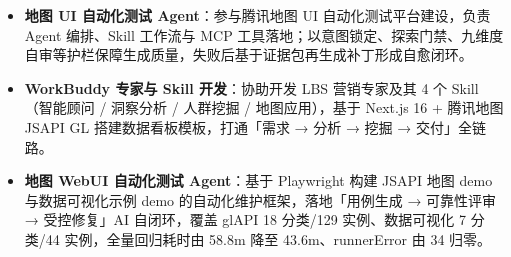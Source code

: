 \documentclass[10pt]{article}
\begin{document}
    \begin{itemize}
        \item \textbf{地图 UI 自动化测试 Agent}：参与腾讯地图 UI 自动化测试平台建设，负责 Agent 编排、Skill 工作流与 MCP 工具落地；以意图锁定、探索门禁、九维度自审等护栏保障生成质量，失败后基于证据包再生成补丁形成自愈闭环。

        \item \textbf{WorkBuddy 专家与 Skill 开发}：协助开发 LBS 营销专家及其 4 个 Skill（智能顾问 / 洞察分析 / 人群挖掘 / 地图应用），基于 Next.js 16 + 腾讯地图 JSAPI GL 搭建数据看板模板，打通「需求 → 分析 → 挖掘 → 交付」全链路。
        \item \textbf{地图 WebUI 自动化测试 Agent}：基于 Playwright 构建 JSAPI 地图 demo 与数据可视化示例 demo 的自动化维护框架，落地「用例生成 → 可靠性评审 → 受控修复」AI 自闭环，覆盖 glAPI 18 分类/129 实例、数据可视化 7 分类/44 实例，全量回归耗时由 58.8m 降至 43.6m、runnerError 由 34 归零。


    \end{itemize}

\end{document}
